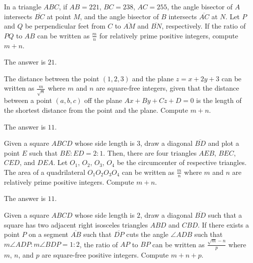 \begin{problem}
In a triangle $ABC$, if $AB=221$, $BC=238$, $AC=255$, the angle bisector of $A$ intersects $\overline{BC}$ at point $M$, and the angle bisector of $B$ intersects $\overline{AC}$ at $N$. Let $P$ and $Q$ be perpendicular feet from $C$ to $\overline{AM}$ and $\overline{BN}$, respectively. If the ratio of $PQ$ to $AB$ can be written as $\frac{m}{n}$ for relatively prime positive integers, compute $m+n$.
\end{problem}

\begin{solution}
The answer is $21$.
\end{solution}

\begin{problem}
The distance between the point $(1,2,3)$ and the plane $z=x+2y+3$ can be written as $\frac{m}{\sqrt{n}}$ where $m$ and $n$ are square-free integers, given that the distance between a point $(a,b,c)$ off the plane $Ax+By+Cz+D=0$ is the length of the shortest distance from the point and the plane. Compute $m+n$.
\end{problem}

\begin{solution}
The answer is $11$.
\end{solution}

\begin{problem}
Given a square $ABCD$ whose side length is $3$, draw a diagonal $\overline{BD}$ and plot a point $E$ such that $BE:ED=2:1$. Then, there are four triangles $AEB$, $BEC$, $CED$, and $DEA$. Let $O_1$, $O_2$, $O_3$, $O_4$ be the circumcenter of respective triangles. The area of a quadrilateral $O_1O_2O_3O_4$ can be written as $\frac{m}{n}$ where $m$ and $n$ are relatively prime positive integers. Compute $m+n$.
\end{problem}

\begin{solution}
The answer is $11$.
\end{solution}

\begin{problem}
Given a square $ABCD$ whose side length is $2$, draw a diagonal $\overline{BD}$ such that a square has two adjacent right isosceles triangles $ABD$ and $CBD$. If there exists a point $P$ on a segment $\overline{AB}$ such that $\overline{DP}$ cuts the angle $\angle ADB$ such that $m\angle ADP : m \angle BDP = 1:2$, the ratio of $AP$ to $BP$ can be written as $\frac{\sqrt{m}-n}{p}$ where $m$, $n$, and $p$ are square-free positive integers. Compute $m+n+p$.
\end{problem}

